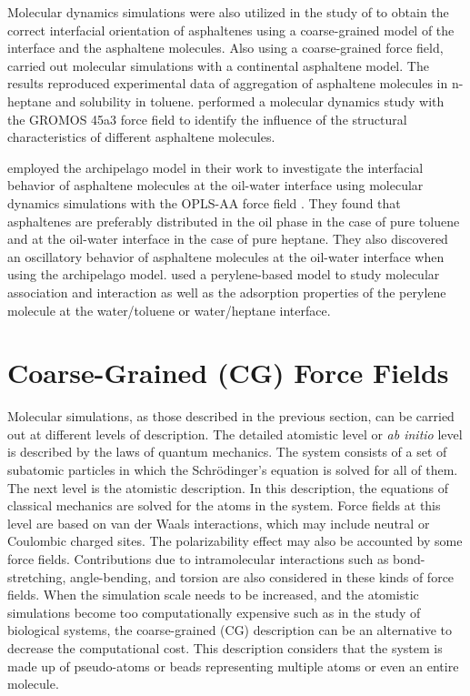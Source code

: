 Molecular dynamics simulations were also utilized in the study of   to obtain the correct interfacial orientation of asphaltenes using a coarse-grained model of the interface and the asphaltene molecules. Also using a coarse-grained force field,  carried out molecular simulations with a continental asphaltene model. The results reproduced experimental data of aggregation
of asphaltene molecules in n-heptane and solubility in toluene.  performed a molecular
dynamics study with the GROMOS 45a3 force field \cite{JCC:JCC1078} to identify the influence of the structural characteristics of different asphaltene molecules.

 employed the archipelago model in their work to investigate the interfacial behavior of asphaltene molecules at the oil-water interface using molecular dynamics simulations with the OPLS-AA force field \cite{doi:10.1021/ja00214a001}. They found that asphaltenes are preferably distributed in the oil phase in the case of pure toluene and at the oil-water interface
in the case of pure heptane. They also discovered an
oscillatory behavior of asphaltene molecules at the oil-water interface when using the archipelago model.  used a perylene-based model to study molecular association and interaction as well as the adsorption properties of the perylene molecule at the water/toluene or water/heptane interface. 

\section{Coarse-Grained (CG) Force Fields}\label{cgff}


Molecular simulations, as those described in the previous section, can be carried out at different levels of description. The detailed atomistic level or \textit{ab initio} level is described by the laws of quantum mechanics. The system consists of a set of subatomic particles in which the Schr\"{o}dinger's equation is solved for all of them. The next level is the atomistic description. In this description, the equations of classical mechanics are solved for the atoms in the system.  Force fields at this level are based on van der Waals interactions, which may include neutral or Coulombic charged sites. The polarizability effect may also be accounted by some force fields. Contributions due to intramolecular interactions such as bond-stretching, angle-bending, and torsion are also considered in these kinds of force fields. When the simulation scale needs to be increased, and the atomistic simulations become too computationally expensive such as in the study of biological systems, the coarse-grained (CG) description can be an alternative to decrease the computational cost. This description considers that the system is made up of pseudo-atoms or beads representing multiple atoms or even an entire molecule. 

